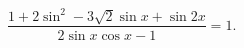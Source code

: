 \begin{ex}[type=equation]
	\begin{condition}
		$ \dfrac{1+2\sin^2 - 3\sqrt{2}\sin x +\sin 2x}{2\sin x \cos x -1 } = 1. $
	\end{condition}
\end{ex}